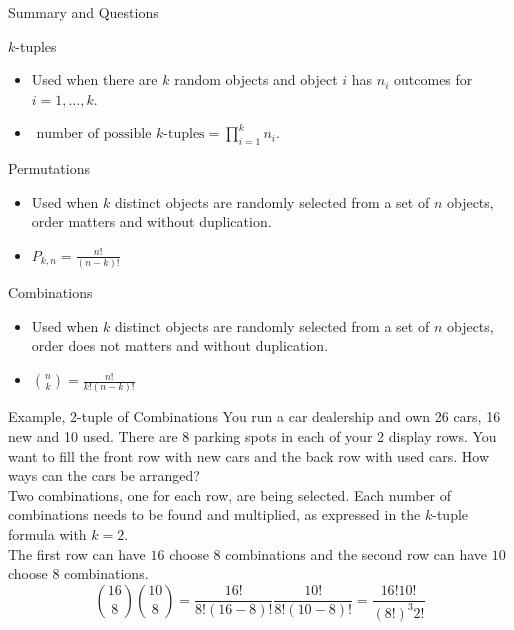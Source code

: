 \documentclass[handout]{beamer}
\newcommand{\nl}[1]{\vspace{#1 em}}
\begin{document}
\begin{frame}{Summary and Questions}
    \begin{block}{$k$-tuples}
        \begin{itemize}
            \item Used when there are $k$ random objects and object $i$ has $n_i$ outcomes for $i=1,\ldots, k$.
            \item $\text{ number of possible } k\text{-tuples} = \prod_{i=1}^k n_i$.
        \end{itemize}
    \end{block}
    \begin{block}{Permutations}
        \begin{itemize}
            \item Used when $k$ distinct objects are randomly selected from a set of $n$ objects, order matters and without duplication.
            \item $P_{k,n} = \frac{n!}{(n-k)!}$
        \end{itemize}
    \end{block}
    \begin{block}{Combinations}
        \begin{itemize}
            \item Used when $k$ distinct objects are randomly selected from a set of $n$ objects, order does not matters and without duplication.
            \item $\binom{n}{k} = \frac{n!}{k!(n-k)!}$
        \end{itemize}
    \end{block}
\end{frame}


\begin{frame}{Example, 2-tuple of Combinations}
    You run a car dealership and own 26 cars, 16 new and 10 used. There are 8 parking spots in each of your 2 display rows. You want to fill the front row with new cars and the back row with used cars. How ways can the cars be arranged?\\
    \nl{0.5}
    \pause Two combinations, one for each row, are being selected. Each number of combinations needs to be found and multiplied, as expressed in the $k$-tuple formula with $k=2$.\\
    \pause The first row can have $16$ choose $8$ combinations and the second row can have $10$ choose $8$ combinations.
    \[\binom{16}{8}\binom{10}{8} = \frac{16!}{8!(16-8)!} \frac{10!}{8!(10-8)!} = \frac{16! 10!}{(8!)^3 2!}\]
\end{frame}
\end{document}
